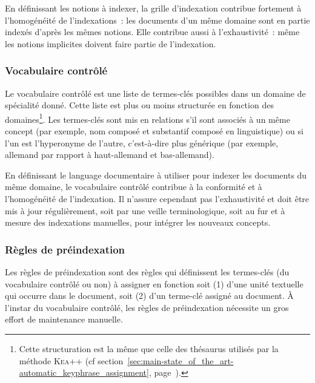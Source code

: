         En définissant les notions à indexer, la grille d'indexation contribue
        fortement à l'homogénéité de l'indexations~: les documents d'un même
        domaine sont en partie indexés d'après les mêmes notions. Elle contribue
        aussi à l'exhaustivité~: même les notions implicites doivent faire
        partie de l'indexation.

      \subsubsection{Vocabulaire contrôlé}
      \label{subsubsec:main-domain_specific_keyphrase_annotation-manual_keyphrase_annotation-resources-controlled_vocabulary}
        Le vocabulaire contrôlé est une liste de termes-clés possibles dans un
        domaine de spécialité donné. Cette liste est plus ou moins structurée en
        fonction des domaines\footnote{Cette structuration est la même que celle
        des thésaurus utilisés par la méthode \textsc{Kea++} (cf
        section~\ref{sec:main-state_of_the_art-automatic_keyphrase_assignment},
        page~\pageref{sec:main-state_of_the_art-automatic_keyphrase_assignment}).}.
        Les termes-clés sont mis en relations s'il sont associés à un même
        concept (par exemple, \og{}nom composé\fg{} et \og{}substantif
        composé\fg{} en linguistique) ou si l'un est l'hyperonyme de l'autre,
        c'est-à-dire plus  générique (par exemple, \og{}allemand\fg{} par
        rapport à \og{}haut-allemand\fg{} et \og{}bas-allemand\fg{}).
        
        En définissant le language documentaire à utiliser pour indexer les
        documents du même domaine, le vocabulaire contrôlé contribue à la
        conformité et à l'homogénéité de l'indexation. Il n'assure cependant pas
        l'exhaustivité et doit être mis à jour régulièrement, soit par une
        veille terminologique, soit au fur et à mesure des indexations
        manuelles, pour intégrer les nouveaux concepts.

      \subsubsection{Règles de préindexation}
      \label{subsubsec:main-domain_specific_keyphrase_annotation-manual_keyphrase_annotation-resources-preindexing_rules}
        Les règles de préindexation sont des règles qui définissent les
        termes-clés (du vocabulaire contrôlé ou non) à assigner en fonction soit
        (1) d'une unité textuelle qui occurre dans le document, soit (2) d'un
        terme-clé assigné au document. À l'instar du vocabulaire contrôlé, les
        règles de préindexation nécessite un gros effort de maintenance manuelle.
        
